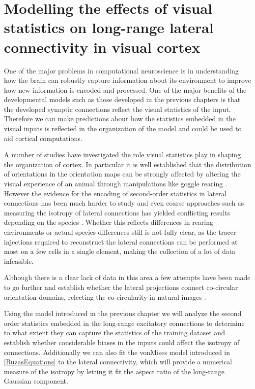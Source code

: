 \chapter{Modelling the effects of visual statistics on long-range lateral connectivity in visual cortex}

One of the major problems in computational neuroscience is in
understanding how the brain can robustly capture information about its
environment to improve how new information is encoded and
processed. One of the major benefits of the developmental models such
as those developed in the previous chapters is that the developed
synaptic connections reflect the visual statistics of the
input. Therefore we can make predictions about how the statistics
embedded in the visual inputs is reflected in the organization of the
model and could be used to aid cortical computations.

A number of studies have investigated the role visual statistics play
in shaping the organization of cortex. In particular it is well
established that the distribution of orientations in the orientation
maps can be strongly affected by altering the visual experience of an
animal through manipulations like goggle rearing
\cite{Tanaka2006}. However the evidence for the encoding of
second-order statistics in lateral connections has been much harder to
study and even coarse approaches such as measuring the isotropy of
lateral connections has yielded conflicting results depending on the
species \citep{Sincich2001, Bosking1997, Schmidt1997, Angelucci2002}.
Whether this reflects differences in rearing environments or actual
species differences still is not fully clear, as the tracer injections
required to reconstruct the lateral connections can be performed at
most on a few cells in a single element, making the collection of a
lot of data infeasible.

Although there is a clear lack of data in this area a few attempts
have been made to go further and establish whether the lateral
projections connect co-circular orientation domains, relecting the
co-circularity in natural images \citep{Hunt2011}.

Using the model introduced in the previous chapter we will analyze the
second order statistics embedded in the long-range excitatory
connections to determine to what extent they can capture the
statistics of the training dataset and establish whether considerable
biases in the inputs could affect the isotropy of
connections. Additionally we can also fit the vonMises model
introduced in \ref{BuzasEquations} to the lateral connectivity, which
will provide a numerical measure of the isotropy by letting it fit the
aspect ratio of the long-range Gaussian component.


